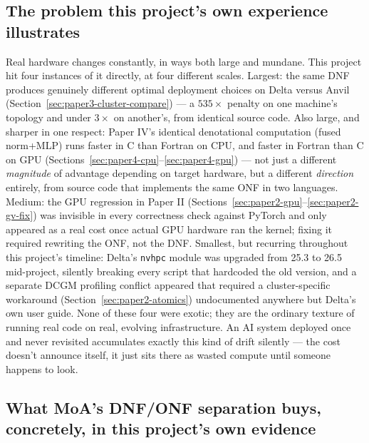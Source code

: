\documentclass[11pt]{article}
\begin{document}
\subsection{The problem this project's own experience illustrates}

Real hardware changes constantly, in ways both large and mundane. This
project hit four instances of it directly, at four different scales.
Largest: the same DNF produces genuinely different optimal deployment
choices on Delta versus Anvil (Section~\ref{sec:paper3-cluster-compare})
--- a $535\times$ penalty on one machine's topology and under $3\times$
on another's, from identical source code. Also large, and sharper in
one respect: Paper IV's identical denotational computation (fused
norm+MLP) runs faster in C than Fortran on CPU, and faster in Fortran
than C on GPU (Sections~\ref{sec:paper4-cpu}--\ref{sec:paper4-gpu}) ---
not just a different \emph{magnitude} of advantage depending on target
hardware, but a different \emph{direction} entirely, from source code
that implements the same ONF in two languages. Medium: the GPU
regression in Paper II (Sections~\ref{sec:paper2-gpu}--\ref{sec:paper2-gv-fix})
was invisible in every correctness check against PyTorch and only
appeared as a real cost once actual GPU hardware ran the kernel; fixing
it required rewriting the ONF, not the DNF. Smallest, but recurring
throughout this project's timeline: Delta's \texttt{nvhpc} module was
upgraded from 25.3 to 26.5 mid-project, silently breaking every script
that hardcoded the old version, and a separate DCGM profiling conflict
appeared that required a cluster-specific workaround
(Section~\ref{sec:paper2-atomics}) undocumented anywhere but Delta's
own user guide. None of these four were exotic; they are the ordinary
texture of running real code on real, evolving infrastructure. An AI
system deployed once and never revisited accumulates exactly this kind
of drift silently --- the cost doesn't announce itself, it just sits
there as wasted compute until someone happens to look.

\subsection{What MoA's DNF/ONF separation buys, concretely, in this
project's own evidence}
\end{document}
